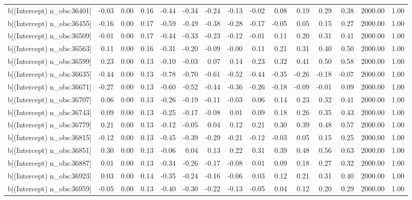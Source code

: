 \begin{table}[ht]
\begin{tabular}{rrrrrrrrrrrrrrr}
  b[(Intercept) n\_obs:36401] & -0.03 & 0.00 & 0.16 & -0.44 & -0.34 & -0.24 & -0.13 & -0.02 & 0.08 & 0.19 & 0.29 & 0.38 & 2000.00 & 1.00 \\ 
  b[(Intercept) n\_obs:36455] & -0.16 & 0.00 & 0.17 & -0.59 & -0.49 & -0.38 & -0.28 & -0.17 & -0.05 & 0.05 & 0.15 & 0.27 & 2000.00 & 1.00 \\ 
  b[(Intercept) n\_obs:36509] & -0.01 & 0.00 & 0.17 & -0.44 & -0.33 & -0.23 & -0.12 & -0.01 & 0.11 & 0.20 & 0.31 & 0.41 & 2000.00 & 1.00 \\ 
  b[(Intercept) n\_obs:36563] & 0.11 & 0.00 & 0.16 & -0.31 & -0.20 & -0.09 & -0.00 & 0.11 & 0.21 & 0.31 & 0.40 & 0.50 & 2000.00 & 1.00 \\ 
  b[(Intercept) n\_obs:36599] & 0.23 & 0.00 & 0.13 & -0.10 & -0.03 & 0.07 & 0.14 & 0.23 & 0.32 & 0.41 & 0.50 & 0.58 & 2000.00 & 1.00 \\ 
  b[(Intercept) n\_obs:36635] & -0.44 & 0.00 & 0.13 & -0.78 & -0.70 & -0.61 & -0.52 & -0.44 & -0.35 & -0.26 & -0.18 & -0.07 & 2000.00 & 1.00 \\ 
  b[(Intercept) n\_obs:36671] & -0.27 & 0.00 & 0.13 & -0.60 & -0.52 & -0.44 & -0.36 & -0.26 & -0.18 & -0.09 & -0.01 & 0.09 & 2000.00 & 1.00 \\ 
  b[(Intercept) n\_obs:36707] & 0.06 & 0.00 & 0.13 & -0.26 & -0.19 & -0.11 & -0.03 & 0.06 & 0.14 & 0.23 & 0.32 & 0.41 & 2000.00 & 1.00 \\ 
  b[(Intercept) n\_obs:36743] & 0.09 & 0.00 & 0.13 & -0.25 & -0.17 & -0.08 & 0.01 & 0.09 & 0.18 & 0.26 & 0.35 & 0.43 & 2000.00 & 1.00 \\ 
  b[(Intercept) n\_obs:36779] & 0.21 & 0.00 & 0.13 & -0.12 & -0.05 & 0.04 & 0.12 & 0.21 & 0.30 & 0.39 & 0.48 & 0.57 & 2000.00 & 1.00 \\ 
  b[(Intercept) n\_obs:36815] & -0.12 & 0.00 & 0.13 & -0.45 & -0.39 & -0.29 & -0.21 & -0.12 & -0.03 & 0.05 & 0.15 & 0.25 & 2000.00 & 1.00 \\ 
  b[(Intercept) n\_obs:36851] & 0.30 & 0.00 & 0.13 & -0.06 & 0.04 & 0.13 & 0.22 & 0.31 & 0.39 & 0.48 & 0.56 & 0.63 & 2000.00 & 1.00 \\ 
  b[(Intercept) n\_obs:36887] & 0.01 & 0.00 & 0.13 & -0.34 & -0.26 & -0.17 & -0.08 & 0.01 & 0.09 & 0.18 & 0.27 & 0.32 & 2000.00 & 1.00 \\ 
  b[(Intercept) n\_obs:36923] & 0.03 & 0.00 & 0.14 & -0.35 & -0.24 & -0.16 & -0.06 & 0.03 & 0.12 & 0.21 & 0.31 & 0.40 & 2000.00 & 1.00 \\ 
  b[(Intercept) n\_obs:36959] & -0.05 & 0.00 & 0.13 & -0.40 & -0.30 & -0.22 & -0.13 & -0.05 & 0.04 & 0.12 & 0.20 & 0.29 & 2000.00 & 1.00 \\ 

\end{tabular}
\end{table}

